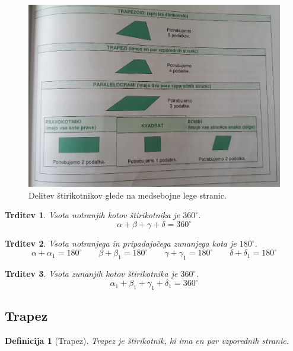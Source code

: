 \documentclass{article}
\newtheorem{definicija}{Definicija}[subsection]
\newtheorem{trditev}{Trditev}[subsection]
\begin{document}
\pagebreak

\begin{figure}[h]
    \includegraphics[width=\linewidth]{delitevGledeNaMedsebojnoLegoStranic2.png}
    \centering
    \caption{Delitev štirikotnikov glede na medsebojne lege stranic.}
\end{figure}

\begin{trditev}
    Vsota notranjih kotov štirikotnika je $360^\circ$.
    \[
        \alpha + \beta + \gamma + \delta = 360^\circ
    \]
\end{trditev}

\begin{trditev}
    Vsota notranjega in pripadajočega zunanjega kota je $180^\circ$.
    \[
        \alpha + \alpha_1 = 180^\circ \quad\quad
        \beta + \beta_1 = 180^\circ \quad\quad
        \gamma + \gamma_1 = 180^\circ \quad\quad
        \delta + \delta_1 = 180^\circ
    \]
\end{trditev}

\begin{trditev}
    Vsota zunanjih kotov štirikotnika je $360^\circ$.
    \[
        \alpha_1 + \beta_1 + \gamma_1 + \delta_1 = 360^\circ
    \]
\end{trditev}

\pagebreak
\subsection{ Trapez }

\begin{definicija}[Trapez]
    Trapez je štirikotnik, ki ima en par vzporednih stranic.  
\end{definicija}
\end{document}
